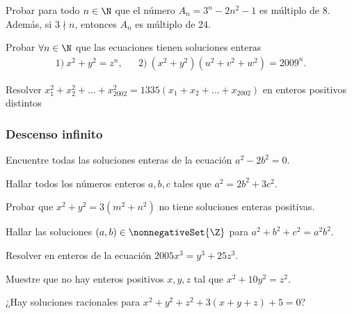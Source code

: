 \begin{exercise}
    Probar para todo $n \in \N$ que el número $A_n = 3^n - 2n^2 - 1$ es múltiplo de $8$.
    Además, si $3\nmid n$, entonces $A_n$ es múltiplo de 24.
\end{exercise}

\begin{problem}
    Probar $\forall n \in \N$ que las ecuaciones tienen soluciones enteras
    \begin{align*}
        1)\ x^2 + y^2 = z^n, && 2)\ (x^2 + y^2)(u^2 + v^2 + w^2) = 2009^n.
    \end{align*}
\end{problem}

\begin{problem}
    Resolver $x_1^2 + x_2^2 + \dots + x_{2002}^2 = 1335\left(x_1 + x_2 + \dots + x_{2002}\right)$ en enteros positivos distintos
\end{problem}



\subsubsection{Descenso infinito}
\begin{exercise}
    Encuentre todas las soluciones enteras de la ecuación $a^2 - 2b^2 = 0$.
\end{exercise}

\begin{exercise}
    Hallar todos los números enteros $a,b,c$ tales que $a^2 = 2b^2 + 3c^2$.
\end{exercise}

\begin{exercise}
    Probar que $x^2 + y^2 = 3(m^2 + n^2)$ no tiene soluciones enteras positivas.
\end{exercise}

\begin{exercise}
    Hallar las soluciones $(a,b) \in \nonnegativeSet{\Z}$ para $a^2 + b^2 + c^2 = a^2 b^2$.
\end{exercise}
\begin{exercise}
    Resolver en enteros de la ecuación $2005x^3 = y^3 + 25z^3$.
\end{exercise}

\begin{exercise}
    Muestre que no hay enteros positivos $x,y,z$ tal que $x^2 + 10y^2 = z^2$.
\end{exercise}

\begin{problem}
    ¿Hay soluciones racionales para $x^2+ y^2 + z^2 + 3(x+y+z) + 5 = 0$?
\end{problem}

